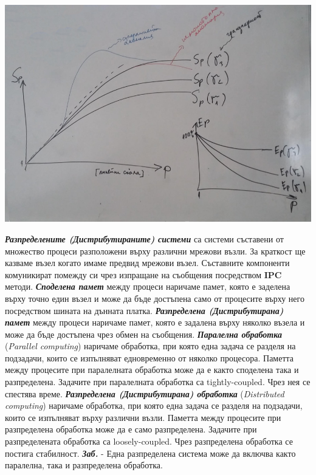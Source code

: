 \documentclass[fleqn,12pt]{article}
\begin{document}
\begin{center}\includegraphics[width=180mm]{speedup_efficiency.png}\end{center}

\textbf{\textit{Разпределените (Дистрибутираните) системи}} са системи съставени от множество процеси разположени върху различни мрежови възли.
За краткост ще казваме възел когато имаме предвид мрежови възел.
Съставните компоненти комуникират помежду си чрез изпращане на съобщения посредством \textbf{IPC} методи.
\bigbreak
\textbf{\textit{Споделена памет}} между процеси наричаме памет, която е заделена върху точно един възел и може да бъде достъпена само от процесите върху него посредством шината на дънната платка.
\bigbreak
\textbf{\textit{Разпределена (Дистрибутирана) памет}} между процеси наричаме памет, която е задалена върху няколко възела и може да бъде достъпена чрез обмен на съобщения.
\bigbreak
\textbf{\textit{Паралелна обработка}} (\textit{Parallel computing}) наричаме обработка, при която една задача се разделя на подзадачи, които се изпълняват едновременно от няколко процесора.
Паметта между процесите при паралелната обработка може да е както споделена така и разпределена.
Задачите при паралелната обработка са tightly-coupled.
Чрез нея се спестява време.
\bigbreak
\textbf{\textit{Разпределена (Дистрибутирана) обработка}} (\textit{Distributed computing}) наричаме обработка, при която една задача се разделя на подзадачи, които се изпълняват върху различни възли.
Паметта между процесите при разпределена обработка може да е само разпределена.
Задачите при разпределената обработка са loosely-coupled.
Чрез разпределена обработка се постига стабилност.
\bigbreak
\textbf{\textit{Заб.}} - Една разпределена система може да включва както паралелна, така и разпределена обработка.
\end{document}
